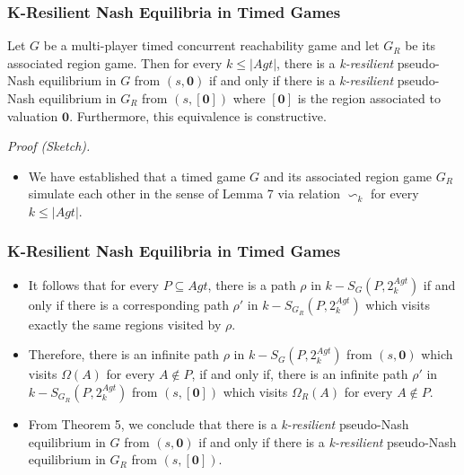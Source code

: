 \documentclass{beamer}
\begin{document}
\begin{frame}
\frametitle{K-Resilient Nash Equilibria in Timed Games}
\begin{theorem}[8]
Let $G$ be a multi-player timed concurrent reachability game and let $G_{R}$ be its associated region game. Then for every $k \leq \vert Agt \vert$, there is a \textit{k-resilient} pseudo-Nash equilibrium in $G$ from $(s, \textbf{0})$ if and only if there is a \textit{k-resilient} pseudo-Nash equilibrium in $G_{R}$ from $(s, [\textbf{0}])$ where $[\textbf{0}]$ is the region associated to valuation $\textbf{0}$. Furthermore, this equivalence is constructive.
\end{theorem}
\textit{Proof (Sketch).}
\begin{itemize}
\item We have established that a timed game $G$ and its associated region game $G_{R}$ simulate each other in the sense of Lemma 7 via relation $\backsim_{k}$ for every $k \leq \vert Agt \vert$.
\end{itemize}
\end{frame}

\begin{frame}
\frametitle{K-Resilient Nash Equilibria in Timed Games}
\begin{itemize}
\item It follows that for every $P \subseteq Agt$, there is a path $\rho$ in $k-S_{G}(P, 2^{Agt}_{k})$ if and only if there is a corresponding path $\rho'$ in $k-S_{G_{R}}(P, 2^{Agt}_{k})$ which visits exactly the same regions visited by $\rho$.
\item Therefore, there is an infinite path $\rho$ in $k-S_{G}(P, 2^{Agt}_{k})$ from $(s, \textbf{0})$ which visits $\Omega(A)$ for every $A \notin P$, if and only if, there is an infinite path $\rho'$ in $k-S_{G_{R}}(P, 2^{Agt}_{k})$ from $(s, [\textbf{0}])$ which visits $\Omega_{R}(A)$ for every $A \notin P$.
\item From Theorem 5, we conclude that there is a \textit{k-resilient} pseudo-Nash equilibrium in $G$ from $(s, \textbf{0})$ if and only if there is a \textit{k-resilient} pseudo-Nash equilibrium in $G_{R}$ from $(s, [\textbf{0}])$. 
\end{itemize}
\end{frame}
\end{document}
